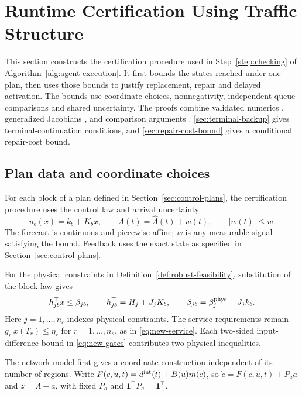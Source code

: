 \documentclass[preprint,12pt]{elsarticle}
\theoremstyle{definition}
\theoremstyle{plain}
\theoremstyle{definition}
\theoremstyle{plain}
\newcommand{\appref}[1]{\ref{#1}}
\begin{document}
\section{Runtime Certification Using Traffic Structure}
\label{sec:new-certification}


This section constructs the certification procedure used in
Step~\ref{step:checking} of Algorithm~\ref{alg:agent-execution}. It first
bounds the states reached under one plan, then uses those bounds to
justify replacement, repair and delayed activation. The bounds use coordinate choices,
nonnegativity, independent queue comparisons and shared uncertainty.
The proofs combine validated numerics \cite{tucker2011validated},
generalized Jacobians \cite{clarke1990optimization}, and comparison
arguments \cite{khalil2002nonlinear,farina2000positive}.
\appref{sec:terminal-backup} gives terminal-continuation conditions, and
\appref{sec:repair-cost-bound} gives a conditional repair-cost bound.

\subsection{Plan data and coordinate choices}

For each block of a plan defined in Section~\ref{sec:control-plans},
the certification procedure uses the control law and arrival uncertainty
\begin{equation}
 u_b(x)=k_b+K_bx,
 \qquad \Lambda(t)=\widehat\Lambda(t)+w(t),
 \qquad |w(t)|\le\bar w.
 \label{eq:new-plan-data}
\end{equation}
The forecast is continuous and piecewise affine; $w$ is any measurable
signal satisfying the bound. Feedback uses the exact state as specified
in Section~\ref{sec:control-plans}.

For the physical constraints in Definition~\ref{def:robust-feasibility},
substitution of the block law gives
\begin{equation}
 h_{jb}^\top x\le\beta_{jb},\qquad
 h_{jb}^\top=H_j+J_jK_b,\qquad
 \beta_{jb}=\beta_j^{\rm phys}-J_jk_b.
 \label{eq:new-physical-rows}
\end{equation}
Here $j=1,\ldots,n_c$ indexes physical constraints. The service
requirements remain $g_r^\top x(T_r)\le\eta_r$ for $r=1,\ldots,n_s$,
as in \eqref{eq:new-service}. Each two-sided input-difference bound in
\eqref{eq:new-gates} contributes two physical inequalities.

The network model first gives a coordinate construction independent of
its number of regions. Write $F(c,u,t)=d^{\rm int}(t)+B(u)m(c)$, so
$\dot c=F(c,u,t)+P_a a$ and $\dot z=\Lambda-a$, with fixed $P_a$ and
$\mathbf1^\top P_a=\mathbf1^\top$.
\end{document}
